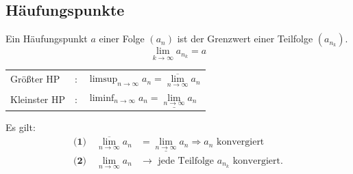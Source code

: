   \subsection{Häufungspunkte}
  \begin{bem}
    Ein Häufungspunkt $a$ einer Folge $(a_n)$ ist der Grenzwert einer Teilfolge $(a_{n_k})$.
    \begin{equation*}
      \lim\limits_{k \rightarrow \infty} a_{n_k} = a
    \end{equation*}
    \begin{tabular}{l c l}
      Größter HP&: & $\limsup_{n \rightarrow \infty} a_n = \overline{\lim\limits_{n \rightarrow \infty}} a_n$ \\
      Kleinster HP&: & $\liminf_{n \rightarrow \infty} a_n = \underline{\lim\limits_{n \rightarrow \infty}} a_n$
    \end{tabular} \newline
    Es gilt:
    \begin{align*}
    \textbf{(1)}\quad \overline{\lim\limits_{n \rightarrow \infty}} a_n &= \underline{\lim\limits_{n \rightarrow \infty}} a_n \Rightarrow a_n \text{ konvergiert} \\
    \textbf{(2)}\quad \lim\limits_{n \rightarrow \infty} a_n  &\rightarrow \text{ jede Teilfolge } a_{n_k} \text{ konvergiert.}
    \end{align*}
  \end{bem}  
  

